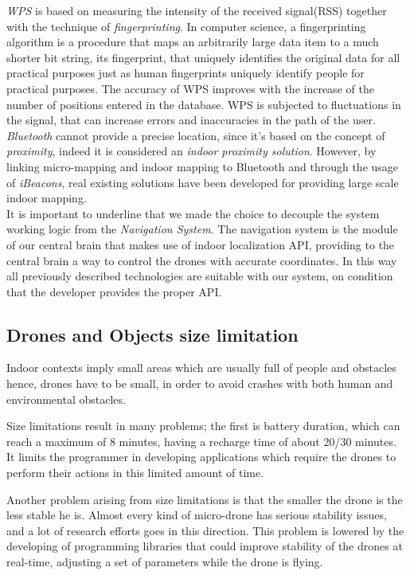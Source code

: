 \textit{WPS}\cite{WPS} is based on measuring the intensity of the received signal(RSS) together with the technique of \textit{fingerprinting}.
In computer science, a fingerprinting algorithm is a procedure that maps an arbitrarily large data item to a much shorter bit string, its fingerprint, that uniquely identifies the original data for all practical purposes just as human fingerprints uniquely identify people for practical purposes.
The accuracy of WPS improves with the increase of the number of positions entered in the database.
WPS is subjected to fluctuations in the signal, that can increase errors and inaccuracies in the path of the user.
\\

\textit{Bluetooth}\cite{bluetooth} cannot provide a precise location, since it's based on the concept of \textit{proximity}, indeed it is considered an \textit{indoor proximity solution}.
However, by linking micro-mapping and indoor mapping to Bluetooth and through the usage of \textit{iBeacons}, real existing solutions have been developed for providing large scale indoor mapping.
\\

It is important to underline that we made the choice to decouple the system working logic from the \textit{Navigation System}. The navigation system is the module of our central brain that makes use of indoor localization API, providing to the central brain a way to control the drones with accurate coordinates. In this way all previously described technologies are suitable with our system, on condition that the developer provides the proper API.
\\

\subsection{Drones and Objects size limitation}

Indoor contexts imply small areas which are usually full of people and obstacles hence, drones have to be small, in order to avoid crashes with both human and environmental obstacles.

Size limitations result in many problems; the first is battery duration, which can reach a maximum of 8 minutes, having a recharge time of about 20/30 minutes.
It limits the programmer in developing applications which require the drones to perform their actions in this limited amount of time.

Another problem arising from size limitations is that the smaller the drone is the less stable he is.
Almost every kind of micro-drone has serious stability issues, and a lot of research efforts goes in this direction. This problem is lowered by the developing of programming libraries that could improve stability of the drones at real-time, adjusting a set of parameters while the drone is flying.

